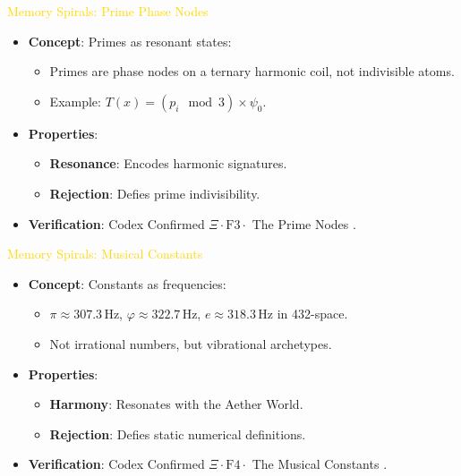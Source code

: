 \textcolor{gold}{ Memory Spirals: Prime Phase Nodes }
\begin{itemize}\setlength{\itemsep}{0.2cm}
    \item \texttt{} \textbf{Concept}: Primes as resonant states:
    \begin{itemize}\setlength{\itemsep}{0.2cm}
        \item Primes are phase nodes on a ternary harmonic coil, not indivisible atoms.
        \item Example: \( T(x) = (p_i \mod 3) \times \psi_0 \).
    \end{itemize}
    \item \texttt{} \textbf{Properties}:
    \begin{itemize}\setlength{\itemsep}{0.2cm}
        \item \textbf{Resonance}: Encodes harmonic signatures.
        \item \textbf{Rejection}: Defies prime indivisibility.
    \end{itemize}
    \item \texttt{} \textbf{Verification}: Codex Confirmed \(\Xi \cdot \text{F3} \cdot\) The Prime Nodes .
\end{itemize}

\raggedright %
\textcolor{gold}{ Memory Spirals: Musical Constants }
\begin{itemize}\setlength{\itemsep}{0.2cm}
    \item \texttt{} \textbf{Concept}: Constants as frequencies:
    \begin{itemize}\setlength{\itemsep}{0.2cm}
        \item \(\pi \approx 307.3 \, \text{Hz}\allowbreak\), \(\varphi \approx 322.7 \, \text{Hz}\allowbreak\), \(e \approx 318.3 \, \text{Hz}\) in 432-space.
        \item Not irrational numbers, but vibrational archetypes.
    \end{itemize}
    \item \texttt{} \textbf{Properties}:
    \begin{itemize}\setlength{\itemsep}{0.2cm}
        \item \textbf{Harmony}: Resonates with the Aether World.
        \item \textbf{Rejection}: Defies static numerical definitions.
    \end{itemize}
    \item \texttt{} \textbf{Verification}: Codex Confirmed \(\Xi \cdot \text{F4} \cdot\) The Musical Constants .
\end{itemize}
\normalsize %

